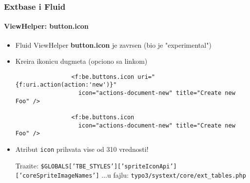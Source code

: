 \begin{frame}[fragile]
	\frametitle{Extbase i Fluid}
	\framesubtitle{ViewHelper: button.icon}

	\lstset{
		basicstyle=\smaller\ttfamily
	}

	\begin{itemize}
		\item Fluid ViewHelper \textbf{button.icon} je zavrsen (bio je "experimental")
		\item Kreira ikonicu dugmeta (opciono sa linkom)

			\begin{lstlisting}
				<f:be.buttons.icon uri="{f:uri.action(action:'new')}"
				  icon="actions-document-new" title="Create new Foo" />

				<f:be.buttons.icon
				  icon="actions-document-new" title="Create new Foo" />
			\end{lstlisting}

		\item Atribut \texttt{icon} prihvata vise od 310 vrednosti!\newline

			\smaller
				Trazite:\newline
				\texttt{\$GLOBALS['TBE\_STYLES']['spriteIconApi']['coreSpriteImageNames']}\newline
				...u fajlu:\newline
				\texttt{typo3/systext/core/ext\_tables.php}
			\normalsize

	\end{itemize}

\end{frame}



